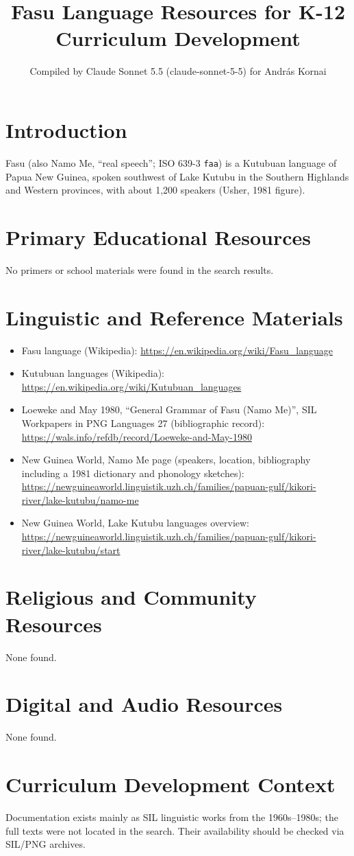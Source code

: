 \documentclass[12pt]{article}
\title{Fasu Language Resources for K-12 Curriculum Development}
\author{Compiled by Claude Sonnet 5.5 (claude-sonnet-5-5) for Andr\'as Kornai}
\date{}
\begin{document}
\maketitle

\section{Introduction}
Fasu (also Namo Me, ``real speech''; ISO 639-3 \texttt{faa}) is a Kutubuan language of Papua New Guinea, spoken southwest of Lake Kutubu in the Southern Highlands and Western provinces, with about 1,200 speakers (Usher, 1981 figure).

\section{Primary Educational Resources}
No primers or school materials were found in the search results.

\section{Linguistic and Reference Materials}
\begin{itemize}
\item Fasu language (Wikipedia): \url{https://en.wikipedia.org/wiki/Fasu_language}
\item Kutubuan languages (Wikipedia): \url{https://en.wikipedia.org/wiki/Kutubuan_languages}
\item Loeweke and May 1980, ``General Grammar of Fasu (Namo Me)'', SIL Workpapers in PNG Languages 27 (bibliographic record): \url{https://wals.info/refdb/record/Loeweke-and-May-1980}
\item New Guinea World, Namo Me page (speakers, location, bibliography including a 1981 dictionary and phonology sketches): \url{https://newguineaworld.linguistik.uzh.ch/families/papuan-gulf/kikori-river/lake-kutubu/namo-me}
\item New Guinea World, Lake Kutubu languages overview: \url{https://newguineaworld.linguistik.uzh.ch/families/papuan-gulf/kikori-river/lake-kutubu/start}
\end{itemize}

\section{Religious and Community Resources}
None found.

\section{Digital and Audio Resources}
None found.

\section{Curriculum Development Context}
Documentation exists mainly as SIL linguistic works from the 1960s--1980s; the full texts were not located in the search. Their availability should be checked via SIL/PNG archives.
\end{document}
